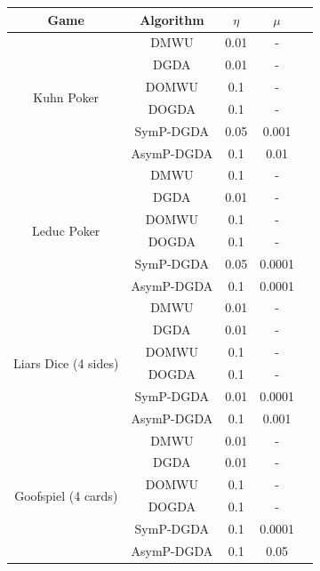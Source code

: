 \documentclass{article}
\theoremstyle{plain}
\begin{document}
\begin{table}[ht!]
    \centering
    \begin{tabular}{c|cccc}
        \hline
        Game & Algorithm  & $\eta$ & $\mu$  \\ \hline
        \multirow{6}{*}{Kuhn Poker}
            & DMWU       & 0.01   & -      \\
            & DGDA       & 0.01   & -      \\
            & DOMWU      & 0.1    & -      \\
            & DOGDA      & 0.1    & -      \\
            & SymP-DGDA  & 0.05    & 0.001  \\
            & AsymP-DGDA & 0.1    & 0.01   \\ \hline

        \multirow{6}{*}{Leduc Poker}
            & DMWU       & 0.1   & -      \\
            & DGDA       & 0.01   & -      \\
            & DOMWU      & 0.1    & -      \\
            & DOGDA      & 0.1    & -      \\
            & SymP-DGDA  & 0.05   & 0.0001 \\
            & AsymP-DGDA & 0.1    & 0.0001 \\ \hline

        \multirow{6}{*}{Liars Dice (4 sides)}
            & DMWU       & 0.01   & -      \\
            & DGDA       & 0.01   & -      \\
            & DOMWU      & 0.1    & -      \\
            & DOGDA      & 0.1    & -      \\
            & SymP-DGDA  & 0.01   & 0.0001 \\
            & AsymP-DGDA & 0.1    & 0.001  \\ \hline

        \multirow{6}{*}{Goofspiel (4 cards)}
            & DMWU       & 0.01    & -      \\
            & DGDA       & 0.01    & -      \\
            & DOMWU      & 0.1   & -      \\
            & DOGDA      & 0.1   & -      \\
            & SymP-DGDA  & 0.1    & 0.0001 \\
            & AsymP-DGDA & 0.1    & 0.05   \\ \hline


\end{tabular}
\end{table}
\end{document}
